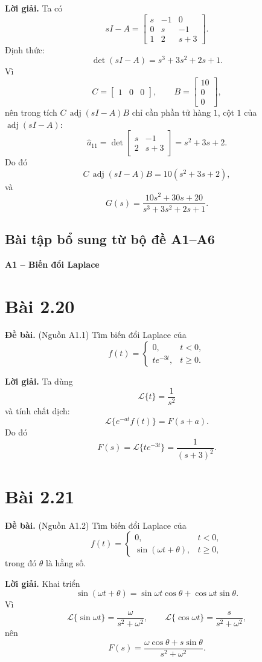 \documentclass[11pt,a4paper]{article}
\newcommand{\baitap}[1]{%
  \Needspace{4\baselineskip}%
  \section*{Bài #1}%
}
\newcommand{\debai}{\par\noindent\textbf{Đề bài.}\enspace}
\newcommand{\loigiai}{\par\smallskip\noindent\textbf{Lời giải.}\enspace}
\newcommand{\Lap}{\mathcal{L}}
\begin{document}
\loigiai
Ta có
\[
sI-A=
\begin{bmatrix}
s&-1&0\\
0&s&-1\\
1&2&s+3
\end{bmatrix}.
\]
Định thức:
\[
\det(sI-A)
=s^3+3s^2+2s+1.
\]
Vì
\[
C=\begin{bmatrix}1&0&0\end{bmatrix},
\qquad
B=\begin{bmatrix}10\\0\\0\end{bmatrix},
\]
nên trong tích \(C\,\operatorname{adj}(sI-A)B\) chỉ cần phần tử hàng \(1\), cột \(1\) của \(\operatorname{adj}(sI-A)\):
\[
\hat a_{11}
=
\det
\begin{bmatrix}
s&-1\\
2&s+3
\end{bmatrix}
=s^2+3s+2.
\]
Do đó
\[
C\,\operatorname{adj}(sI-A)B
=10(s^2+3s+2),
\]
và
\[
\boxed{
G(s)=
\frac{10s^2+30s+20}
{s^3+3s^2+2s+1}.}
\]



\subsection*{Bài tập bổ sung từ bộ đề A1--A6}

\textbf{A1 -- Biến đổi Laplace}

\baitap{2.20}
\debai
(Nguồn A1.1) Tìm biến đổi Laplace của
\[
f(t)=
\begin{cases}
0,&t<0,\\
t e^{-3t},&t\ge0.
\end{cases}
\]

\loigiai
Ta dùng
\[
\Lap\{t\}=\frac1{s^2}
\]
và tính chất dịch:
\[
\Lap\{e^{-at}f(t)\}=F(s+a).
\]
Do đó
\[
\boxed{
F(s)=\Lap\{te^{-3t}\}=\frac1{(s+3)^2}.
}
\]

\baitap{2.21}
\debai
(Nguồn A1.2) Tìm biến đổi Laplace của
\[
f(t)=
\begin{cases}
0,&t<0,\\
\sin(\omega t+\theta),&t\ge0,
\end{cases}
\]
trong đó \(\theta\) là hằng số.

\loigiai
Khai triển
\[
\sin(\omega t+\theta)
=
\sin\omega t\cos\theta+\cos\omega t\sin\theta.
\]
Vì
\[
\Lap\{\sin\omega t\}=\frac{\omega}{s^2+\omega^2},
\qquad
\Lap\{\cos\omega t\}=\frac{s}{s^2+\omega^2},
\]
nên
\[
\boxed{
F(s)=
\frac{\omega\cos\theta+s\sin\theta}
{s^2+\omega^2}.
}
\]
\end{document}
